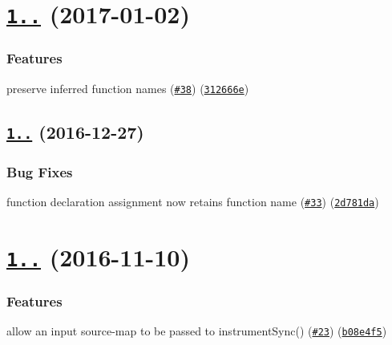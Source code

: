 \label{_1.4.0}%
 \section*{\href{https://github.com/istanbuljs/istanbul-lib-instrument/compare/v1.3.1...v1.4.0}{\tt 1..} (2017-\/01-\/02)}

\subsubsection*{Features}


\begin{DoxyItemize}
\item preserve inferred function names (\href{https://github.com/istanbuljs/istanbul-lib-instrument/issues/38}{\tt \#38}) (\href{https://github.com/istanbuljs/istanbul-lib-instrument/commit/312666e}{\tt 312666e})
\end{DoxyItemize}

\label{_1.3.1}%
 \subsection*{\href{https://github.com/istanbuljs/istanbul-lib-instrument/compare/v1.3.0...v1.3.1}{\tt 1..} (2016-\/12-\/27)}

\subsubsection*{Bug Fixes}


\begin{DoxyItemize}
\item function declaration assignment now retains function name (\href{https://github.com/istanbuljs/istanbul-lib-instrument/issues/33}{\tt \#33}) (\href{https://github.com/istanbuljs/istanbul-lib-instrument/commit/2d781da}{\tt 2d781da})
\end{DoxyItemize}

\label{_1.3.0}%
 \section*{\href{https://github.com/istanbuljs/istanbul-lib-instrument/compare/v1.2.0...v1.3.0}{\tt 1..} (2016-\/11-\/10)}

\subsubsection*{Features}


\begin{DoxyItemize}
\item allow an input source-\/map to be passed to instrument\+Sync() (\href{https://github.com/istanbuljs/istanbul-lib-instrument/issues/23}{\tt \#23}) (\href{https://github.com/istanbuljs/istanbul-lib-instrument/commit/b08e4f5}{\tt b08e4f5})
\end{DoxyItemize}

